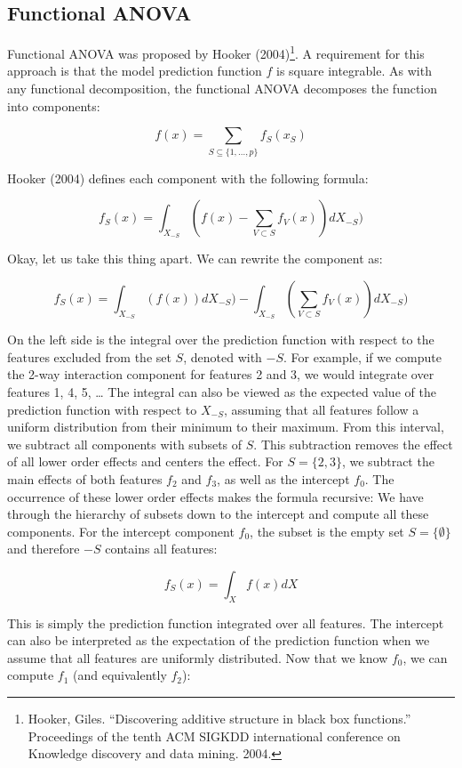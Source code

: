 \documentclass[
  12pt,
]{krantz}
\begin{document}
\hypertarget{functional-anova}{%
\subsection{Functional ANOVA}\label{functional-anova}}

Functional ANOVA was proposed by Hooker (2004)\footnote{Hooker, Giles. ``Discovering additive structure in black box functions.'' Proceedings of the tenth ACM SIGKDD international conference on Knowledge discovery and data mining. 2004.}.
A requirement for this approach is that the model prediction function \(f\) is square integrable.
As with any functional decomposition, the functional ANOVA decomposes the function into components:

\[f(x) = \sum_{S\subseteq\{1,\ldots,p\}} f_S(x_S)\]

Hooker (2004) defines each component with the following formula:

\[f_S(x) = \int_{X_{-S}} \left( f(x) - \sum_{V \subset S} f_V(x)\right) d X_{-S})\]

Okay, let us take this thing apart.
We can rewrite the component as:

\[f_S(x) = \int_{X_{-S}} \left( f(x)\right) d X_{-S}) - \int_{X_{-S}} \left(\sum_{V \subset S} f_V(x) \right) d X_{-S})\]

On the left side is the integral over the prediction function with respect to the features excluded from the set \(S\), denoted with \(-S\).
For example, if we compute the 2-way interaction component for features 2 and 3, we would integrate over features 1, 4, 5, \ldots{}
The integral can also be viewed as the expected value of the prediction function with respect to \(X_{-S}\), assuming that all features follow a uniform distribution from their minimum to their maximum.
From this interval, we subtract all components with subsets of \(S\).
This subtraction removes the effect of all lower order effects and centers the effect.
For \(S=\{2,3\}\), we subtract the main effects of both features \(f_2\) and \(f_3\), as well as the intercept \(f_0\).
The occurrence of these lower order effects makes the formula recursive: We have through the hierarchy of subsets down to the intercept and compute all these components.
For the intercept component \(f_0\), the subset is the empty set \(S=\{\emptyset\}\) and therefore \(-S\) contains all features:

\[f_S(x) = \int_{X} f(x) dX\]

This is simply the prediction function integrated over all features.
The intercept can also be interpreted as the expectation of the prediction function when we assume that all features are uniformly distributed.
Now that we know \(f_0\), we can compute \(f_1\) (and equivalently \(f_2\)):
\end{document}
